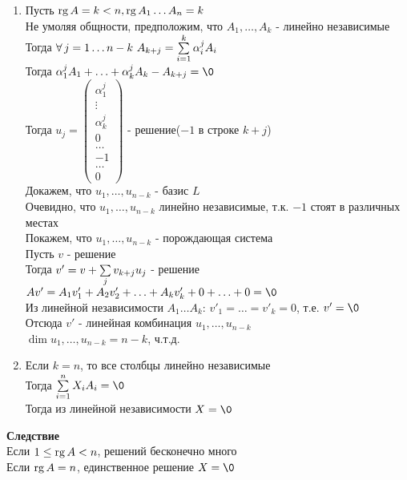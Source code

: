 \documentclass[12pt]{article}
\begin{document}
\begin{enumerate}
    \item Пусть $\operatorname{rg} A = k < n, \operatorname{rg} A_1\ldots A_n =  k$\\
    Не умоляя общности, предположим, что $A_1,\ldots, A_k$ - линейно независимые\\
    Тогда $\forall\,j=1\ldots n-k\ A_{k+j} = \sum\limits_{i=1}^k \alpha_i^j A_i$\\
    Тогда $\alpha_1^j A_1 + \ldots + \alpha_k^j A_k - A_{k+j} = \0$\\
    Тогда $u_j = \begin{pmatrix}
        \alpha_1^j\\
        \vdots\\
        \alpha_k^j\\
        0\\
        \ldots\\
        -1\\
        \ldots\\
        0
    \end{pmatrix}$ - решение($-1$ в строке $k+j$)\\
    Докажем, что $u_1, \ldots, u_{n-k}$ - базис $L$\\
    Очевидно, что $u_1, \ldots, u_{n-k}$ линейно независимые, т.к. $-1$ стоят в различных местах\\
    Покажем, что $u_1, \ldots, u_{n-k}$ - порождающая система\\
    Пусть $v$ - решение\\
    Тогда $v' = v+\sum\limits_{j}v_{k+j}u_j$ - решение\\
    $Av' = A_1v'_1 + A_2v'_2 + \ldots + A_kv'_k + 0 + \ldots + 0 = \0$\\
    Из линейной независимости $A_1 \ldots A_k$: $v'_1 = \ldots = v'_k = 0$, т.е. $v' = \0$\\
    Отсюда $v'$ - линейная комбинация $u_1, \ldots, u_{n-k}$\\
    $\dim u_1, \ldots, u_{n-k} = n - k$, ч.т.д.
    \item Если $k = n$, то все столбцы линейно независимые\\
    Тогда $\suml_{i=1}^n X_iA_i = \0$\\
    Тогда из линейной независимости $X=\0$
\end{enumerate}
\textbf{Следствие}\\
Если $1 \leq \operatorname{rg} A < n$, решений бесконечно много\\
Если $\operatorname{rg} A = n$, единственное решение $X=\0$\\
\end{document}
